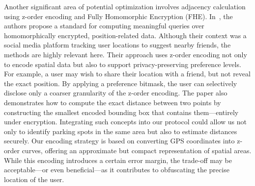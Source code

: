Another significant area of potential optimization involves adjacency calculation using z-order encoding and Fully Homomorphic Encryption (FHE). In~\cite{zhang2020privacy}, the authors propose a standard for computing meaningful queries over homomorphically encrypted, position-related data. Although their context was a social media platform tracking user locations to suggest nearby friends, the methods are highly relevant here. Their approach uses z-order encoding not only to encode spatial data but also to support privacy-preserving preference levels.
For example, a user may wish to share their location with a friend, but not reveal the exact position. By applying a preference bitmask, the user can selectively disclose only a coarser granularity of the z-order encoding. The paper also demonstrates how to compute the exact distance between two points by constructing the smallest encoded bounding box that contains them—entirely under encryption. Integrating such concepts into our protocol could allow us not only to identify parking spots in the same area but also to estimate distances securely.
Our encoding strategy is based on converting GPS coordinates into z-order curves, offering an approximate but compact representation of spatial areas. While this encoding introduces a certain error margin, the trade-off may be acceptable—or even beneficial—as it contributes to obfuscating the precise location of the user.

